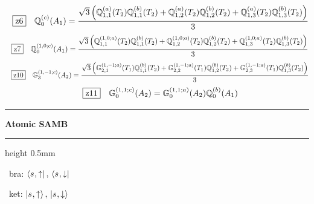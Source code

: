 \documentclass[fleqn,10pt,landscape]{jsarticle}
\begin{document}
\begin{dmath*}
\hspace*{3mm}\fbox{z6}\quad \mathbb{Q}_{0}^{(c)}(A_{1})=\frac{\sqrt{3} \left(\mathbb{Q}_{1,1}^{(a)}(T_{2}) \mathbb{Q}_{1,1}^{(b)}(T_{2}) + \mathbb{Q}_{1,2}^{(a)}(T_{2}) \mathbb{Q}_{1,2}^{(b)}(T_{2}) + \mathbb{Q}_{1,3}^{(a)}(T_{2}) \mathbb{Q}_{1,3}^{(b)}(T_{2})\right)}{3}
\end{dmath*}
\begin{dmath*}
\hspace*{3mm}\fbox{z7}\quad \mathbb{Q}_{0}^{(1,0;c)}(A_{1})=\frac{\sqrt{3} \left(\mathbb{Q}_{1,1}^{(1,0;a)}(T_{2}) \mathbb{Q}_{1,1}^{(b)}(T_{2}) + \mathbb{Q}_{1,2}^{(1,0;a)}(T_{2}) \mathbb{Q}_{1,2}^{(b)}(T_{2}) + \mathbb{Q}_{1,3}^{(1,0;a)}(T_{2}) \mathbb{Q}_{1,3}^{(b)}(T_{2})\right)}{3}
\end{dmath*}
\begin{dmath*}
\hspace*{3mm}\fbox{z10}\quad \mathbb{G}_{3}^{(1,-1;c)}(A_{2})=\frac{\sqrt{3} \left(\mathbb{G}_{2,1}^{(1,-1;a)}(T_{1}) \mathbb{Q}_{1,1}^{(b)}(T_{2}) + \mathbb{G}_{2,2}^{(1,-1;a)}(T_{1}) \mathbb{Q}_{1,2}^{(b)}(T_{2}) + \mathbb{G}_{2,3}^{(1,-1;a)}(T_{1}) \mathbb{Q}_{1,3}^{(b)}(T_{2})\right)}{3}
\end{dmath*}
\begin{dmath*}
\hspace*{3mm}\fbox{z11}\quad \mathbb{G}_{0}^{(1,1;c)}(A_{2})=\mathbb{G}_{0}^{(1,1;a)}(A_{2}) \mathbb{Q}_{0}^{(b)}(A_{1})
\end{dmath*}
\vspace{5mm}

\vspace{5mm}
\noindent \rule[0.5mm]{5mm}{0.5mm}\hspace{3mm}\textbf{Atomic SAMB}\hspace{3mm}\leaders\hrule height 0.5mm\hfill\kern0pt
\vspace{3mm}

\vspace{5mm}

\noindent\textbullet\, bra: $\bra{s_{},\uparrow},\, \bra{s_{},\downarrow}$

\noindent\textbullet\, ket: $\ket{s_{},\uparrow},\, \ket{s_{},\downarrow}$
\end{document}
